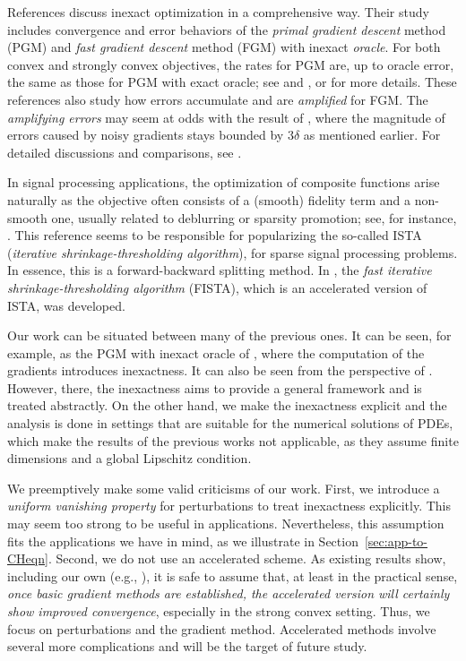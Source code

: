 \documentclass{amsart}
\theoremstyle{definition}
\begin{document}
References \cite{devolder2013exactness, devolder2013firstorder, devolder2013strongconv, devolder2013intermediate} discuss inexact optimization in a comprehensive way.  Their study includes convergence and error behaviors of the \emph{primal gradient descent} method (PGM) and \emph{fast gradient descent} method (FGM) with inexact \emph{oracle}. For both convex and strongly convex objectives, the rates for PGM are, up to oracle error, the same as those for PGM with exact oracle; see \cite[p. 4 Definition 1]{devolder2013firstorder} and \cite[p. 2 Definition 1]{devolder2013strongconv}, or \cite[Definition 4.1 and 5.1]{devolder2013exactness} for more details. These references also study how errors accumulate and are \emph{amplified} for FGM. The \emph{amplifying errors} may seem at odds with the result of \cite{daspremont2008smooth}, where the magnitude of errors caused by noisy gradients stays bounded by $3\delta$ as mentioned earlier.  For detailed discussions and comparisons, see \cite[pp. 133-135]{devolder2013exactness}.

In signal processing applications, the optimization of composite functions arise naturally as the objective often consists of a (smooth) fidelity term and a non-smooth one, usually related to deblurring or sparsity promotion; see, for instance, \cite{daubechies2003iterative}. This reference seems to be responsible for popularizing the so-called ISTA (\emph{iterative shrinkage-thresholding algorithm}), for sparse signal processing problems. In essence, this is a forward-backward splitting method. In \cite{beck2009FISTA}, the \emph{fast iterative shrinkage-thresholding algorithm} (FISTA), which is an accelerated version of ISTA, was developed.

Our work can be situated between many of the previous ones. It can be seen, for example, as the PGM with inexact oracle of \cite{devolder2013strongconv}, where the computation of the gradients introduces inexactness. It can also be seen from the perspective of \cite{schmidt2011convergence}. However, there, the inexactness aims to provide a general framework and is treated abstractly. On the other hand, we make the inexactness explicit and the analysis is done in settings that are suitable for the numerical solutions of PDEs, which make the results of the previous works not applicable, as they assume finite dimensions and a global Lipschitz condition.

We preemptively make some valid criticisms of our work. First, we introduce a \emph{uniform vanishing property} for perturbations to treat inexactness explicitly. This may seem too strong to be useful in applications. Nevertheless, this assumption fits the applications we have in mind, as we illustrate in Section~\ref{sec:app-to-CHeqn}. Second, we do not use an accelerated scheme. As existing results show, including our own (e.g., \cite{psw2021PAGD, psw2023benchmark}), it is safe to assume that, at least in the practical sense, \emph{once basic gradient methods are established, the accelerated version will certainly show improved convergence}, especially in the strong convex setting. Thus, we focus on perturbations and the gradient method. Accelerated methods involve several more complications and will be the target of future study.
\end{document}

